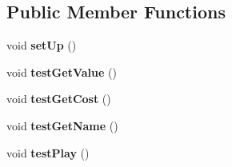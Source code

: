 \subsection*{\-Public \-Member \-Functions}
\begin{DoxyCompactItemize}
\item 
\hypertarget{classdominion_1_1model_1_1MoneyCardTest_afda02f258acf5215d3a5d2dbeaf92aba}{void {\bfseries set\-Up} ()}\label{classdominion_1_1model_1_1MoneyCardTest_afda02f258acf5215d3a5d2dbeaf92aba}

\item 
\hypertarget{classdominion_1_1model_1_1MoneyCardTest_a0fd44d02f2e792f386488085a1e29332}{void {\bfseries test\-Get\-Value} ()}\label{classdominion_1_1model_1_1MoneyCardTest_a0fd44d02f2e792f386488085a1e29332}

\item 
\hypertarget{classdominion_1_1model_1_1MoneyCardTest_a1ee7ba5b0944225f8dc5f0d18cea7acf}{void {\bfseries test\-Get\-Cost} ()}\label{classdominion_1_1model_1_1MoneyCardTest_a1ee7ba5b0944225f8dc5f0d18cea7acf}

\item 
\hypertarget{classdominion_1_1model_1_1MoneyCardTest_ae4f8a816a6066f47c9f81d19fbbda0d0}{void {\bfseries test\-Get\-Name} ()}\label{classdominion_1_1model_1_1MoneyCardTest_ae4f8a816a6066f47c9f81d19fbbda0d0}

\item 
\hypertarget{classdominion_1_1model_1_1MoneyCardTest_ae2507bfec3817c7c4c55431b66a3f214}{void {\bfseries test\-Play} ()}\label{classdominion_1_1model_1_1MoneyCardTest_ae2507bfec3817c7c4c55431b66a3f214}

\end{DoxyCompactItemize}
